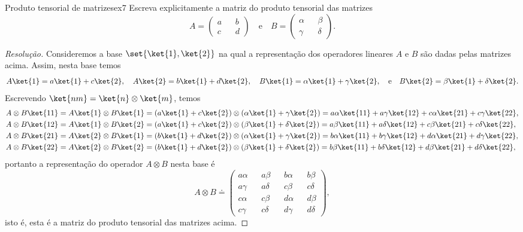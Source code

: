 \begin{exercício}{Produto tensorial de matrizes}{ex7}
    Escreva explicitamente a matriz do produto tensorial das matrizes
    \begin{equation*}
        A = \begin{pmatrix}
           a && b\\ c && d
        \end{pmatrix}
        \quad\text{e}\quad
        B = \begin{pmatrix}
           \alpha && \beta\\ \gamma && \delta
        \end{pmatrix}.
    \end{equation*}
\end{exercício}
\begin{proof}[Resolução]
   Consideremos a base \(\set{\ket{1}, \ket{2}}\) na qual a representação dos operadores lineares \(A\) e \(B\) são dadas pelas matrizes acima. Assim, nesta base temos
   \begin{equation*}
      A \ket{1} = a \ket{1} + c \ket{2}, \quad
      A \ket{2} = b \ket{1} + d \ket{2}, \quad
      B \ket{1} = \alpha \ket{1} + \gamma \ket{2}, \quad\text{e}\quad
      B \ket{2} = \beta \ket{1} + \delta \ket{2}.
   \end{equation*}
   Escrevendo \(\ket{nm} = \ket{n}\otimes \ket{m}\), temos
   \begin{align*}
      A \otimes B \ket{11} &= A \ket{1} \otimes B\ket{1} = (a \ket{1} + c \ket{2}) \otimes (\alpha \ket{1} + \gamma \ket{2}) = a \alpha \ket{11} + a \gamma \ket{12} + c \alpha \ket{21} + c \gamma \ket{22},\\
      A \otimes B \ket{12} &= A \ket{1} \otimes B\ket{2} = (a \ket{1} + c \ket{2}) \otimes (\beta \ket{1} + \delta \ket{2}) = a \beta \ket{11} + a \delta \ket{12} + c \beta \ket{21} + c \delta \ket{22},\\
      A \otimes B \ket{21} &= A \ket{2} \otimes B\ket{1} = (b \ket{1} + d \ket{2}) \otimes (\alpha \ket{1} + \gamma \ket{2}) = b \alpha \ket{11} + b \gamma \ket{12} + d \alpha \ket{21} + d \gamma \ket{22},\\
      A \otimes B \ket{22} &= A \ket{2} \otimes B\ket{2} = (b \ket{1} + d \ket{2}) \otimes (\beta \ket{1} + \delta \ket{2}) = b \beta \ket{11} + b \delta \ket{12} + d \beta \ket{21} + d \delta \ket{22},
   \end{align*}
   portanto a representação do operador \(A \otimes B\) nesta base é 
   \begin{equation*}
       A \otimes B \doteq \begin{pmatrix}
          a \alpha && a \beta && b \alpha && b \beta\\
          a \gamma && a \delta && c \beta && c \delta\\
          c \alpha && c \beta && d \alpha && d \beta\\
          c \gamma && c \delta && d \gamma && d \delta
       \end{pmatrix},
   \end{equation*}
   isto é, esta é a matriz do produto tensorial das matrizes acima.
\end{proof}
